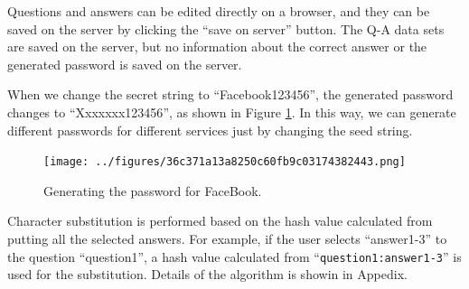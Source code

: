 \documentclass{article}
\begin{document}
Questions and answers can be edited directly on a browser, and they can be
saved on the server by clicking the ``save on server'' button.
The Q-A data sets are saved on the server,
but no information about the correct answer or the
generated password is saved on the server.


When we change the secret string to ``\textsf{Facebook123456}'',
the generated password changes to ``\textsf{Xxxxxxx123456}'',
as shown in Figure \ref{web2}.
In this way, we can generate different passwords for
different services just by changing the seed string.

\begin{figure}[H]
\centerline{\texttt{[image: ../figures/36c371a13a8250c60fb9c03174382443.png]}}
\caption{Generating the password for FaceBook.}
\label{web2}
\end{figure}



Character substitution is performed based on the hash value
calculated from putting all the selected answers.
For example, if the user selects ``answer1-3'' to the question ``question1'',
a hash value calculated from  ``\texttt{question1:answer1-3}''
is used for the substitution.
Details of the algorithm is showin in Appedix.


% 
% 
\end{document}
